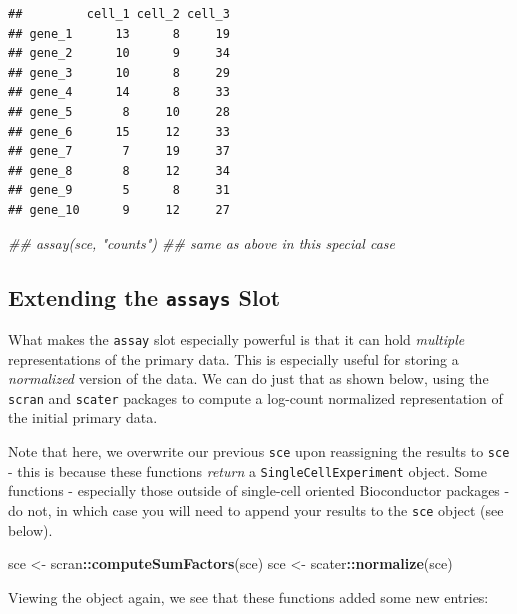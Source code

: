 \documentclass[]{book}
\newenvironment{Shaded}{\begin{snugshade}}{\end{snugshade}}
\newcommand{\CommentTok}[1]{\textcolor[rgb]{0.56,0.35,0.01}{\textit{#1}}}
\newcommand{\KeywordTok}[1]{\textcolor[rgb]{0.13,0.29,0.53}{\textbf{#1}}}
\newcommand{\NormalTok}[1]{#1}
\newcommand{\OperatorTok}[1]{\textcolor[rgb]{0.81,0.36,0.00}{\textbf{#1}}}
\newcommand{\StringTok}[1]{\textcolor[rgb]{0.31,0.60,0.02}{#1}}
\begin{document}
\begin{verbatim}
##         cell_1 cell_2 cell_3
## gene_1      13      8     19
## gene_2      10      9     34
## gene_3      10      8     29
## gene_4      14      8     33
## gene_5       8     10     28
## gene_6      15     12     33
## gene_7       7     19     37
## gene_8       8     12     34
## gene_9       5      8     31
## gene_10      9     12     27
\end{verbatim}

\begin{Shaded}
\begin{Highlighting}[]
\CommentTok{## assay(sce, "counts") ## same as above in this special case}
\end{Highlighting}
\end{Shaded}

\hypertarget{extending-the-assays-slot}{%
\subsection{\texorpdfstring{Extending the \texttt{assays} Slot}{Extending the assays Slot}}\label{extending-the-assays-slot}}

What makes the \texttt{assay} slot especially powerful is that it can hold \emph{multiple} representations of the primary data. This is especially useful for storing a \emph{normalized} version of the data. We can do just that as shown below, using the \texttt{scran} and \texttt{scater} packages to compute a log-count normalized representation of the initial primary data.

Note that here, we overwrite our previous \texttt{sce} upon reassigning the results to \texttt{sce} - this is because these functions \emph{return} a \texttt{SingleCellExperiment} object. Some functions - especially those outside of single-cell oriented Bioconductor packages - do not, in which case you will need to append your results to the \texttt{sce} object (see below).

\begin{Shaded}
\begin{Highlighting}[]
\NormalTok{sce <-}\StringTok{ }\NormalTok{scran}\OperatorTok{::}\KeywordTok{computeSumFactors}\NormalTok{(sce)}
\NormalTok{sce <-}\StringTok{ }\NormalTok{scater}\OperatorTok{::}\KeywordTok{normalize}\NormalTok{(sce)}
\end{Highlighting}
\end{Shaded}

Viewing the object again, we see that these functions added some new entries:
\end{document}
